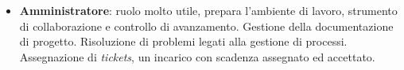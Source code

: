 \begin{itemize}
	\item \textbf{Amministratore}: ruolo molto utile, prepara l'ambiente di lavoro, strumento di collaborazione e controllo di avanzamento. Gestione della documentazione di progetto. Risoluzione di problemi legati alla gestione di processi. Assegnazione di \textit{tickets}, un incarico con scadenza assegnato ed accettato.


\end{itemize}

